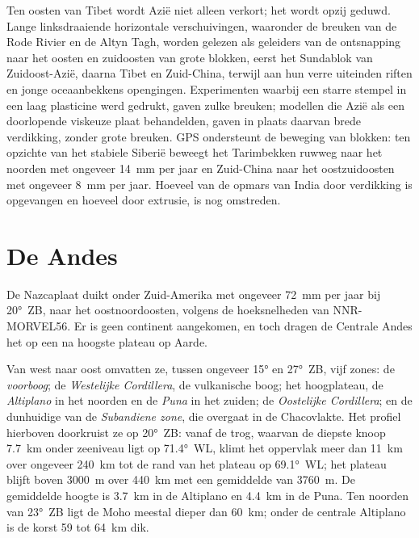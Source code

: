 Ten oosten van Tibet wordt Azië niet alleen verkort; het wordt opzij geduwd. Lange linksdraaiende horizontale
verschuivingen, waaronder de breuken van de Rode Rivier en de Altyn Tagh, worden gelezen als geleiders van
de ontsnapping naar het oosten en zuidoosten van grote blokken, eerst het Sundablok van Zuidoost-Azië,
daarna Tibet en Zuid-China, terwijl aan hun verre uiteinden riften en jonge oceaanbekkens opengingen.
Experimenten waarbij een starre stempel in een laag plasticine werd gedrukt, gaven zulke breuken;
modellen die Azië als een doorlopende viskeuze plaat behandelden, gaven in plaats daarvan brede verdikking, zonder
grote breuken. GPS ondersteunt de beweging van blokken: ten opzichte van het stabiele Siberië beweegt het
Tarimbekken ruwweg naar het noorden met ongeveer \qty{14}{mm} per jaar en Zuid-China naar het oostzuidoosten
met ongeveer \qty{8}{mm} per jaar. Hoeveel van de opmars van India door verdikking is opgevangen en hoeveel
door extrusie, is nog omstreden.

\section{De Andes}\label{sec:b2:himalaya-andes:andes}

De Nazcaplaat duikt onder Zuid-Amerika met ongeveer \qty{72}{mm} per jaar bij
\ang{20}~ZB, naar het oostnoordoosten, volgens de hoeksnelheden van NNR-MORVEL56. Er is geen continent
aangekomen, en toch dragen de Centrale Andes het op een na hoogste plateau op Aarde.

Van west naar oost omvatten ze, tussen ongeveer \ang{15} en \ang{27}~ZB, vijf zones: de
\emph{voorboog}; de \emph{Westelijke Cordillera}, de vulkanische boog; het hoogplateau, de
\emph{Altiplano} in het noorden en de \emph{Puna} in het zuiden; de \emph{Oostelijke
Cordillera}; en de dunhuidige  van de \emph{Subandiene zone}, die
overgaat in de Chacovlakte. Het profiel hierboven doorkruist ze op \ang{20}~ZB: vanaf de trog,
waarvan de diepste knoop \qty{7.7}{km} onder zeeniveau ligt op \ang{71.4}~WL, klimt het oppervlak
meer dan \qty{11}{km} over ongeveer \qty{240}{km} tot de rand van het plateau op \ang{69.1}~WL;
het plateau blijft boven \qty{3000}{m} over \qty{440}{km} met een
gemiddelde van \qty{3760}{m}. De gemiddelde hoogte is \qty{3.7}{km} in de Altiplano en \qty{4.4}{km} in
de Puna. Ten noorden van \ang{23}~ZB ligt de Moho meestal dieper dan \qty{60}{km}; onder de
centrale Altiplano is de korst 59 tot \qty{64}{km} dik.

